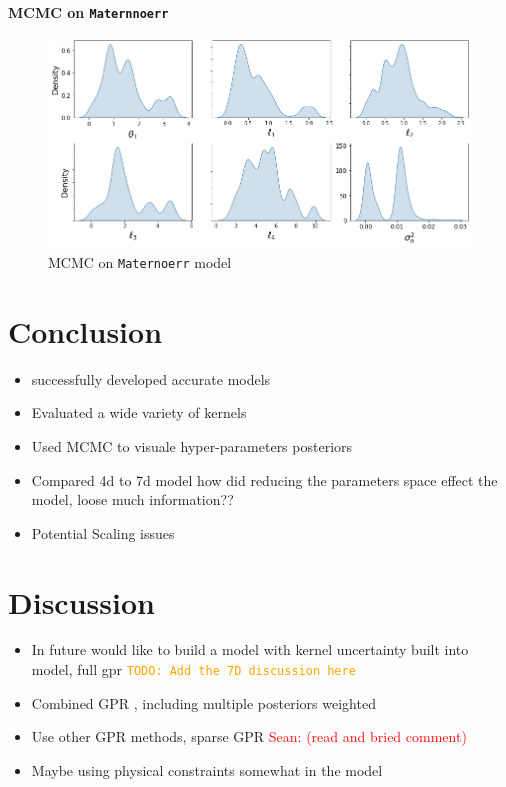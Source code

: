 \documentclass[12pt]{article}
\newcommand{\Sean}[1]{{\textcolor{red}{{Sean: #1}} }}
\newcommand{\todo}[1]{\textcolor{orange}{\texttt{TODO: #1}}}
\begin{document}
\textbf{MCMC on \texttt{Maternnoerr}}
\begin{figure}[H]
    \centering
    \includegraphics[width=1\textwidth]{LatexPlots/final_gps_plots/MCMCWhiteMat.png}
    \caption{MCMC on \texttt{Maternoerr} model}
    \label{fig:MCMCMaternnoerr}
\end{figure}


\section{Conclusion}
\begin{itemize}
    \item successfully developed accurate models
    \item Evaluated a wide variety of kernels
    \item Used MCMC to visuale hyper-parameters posteriors
    \item Compared 4d to 7d model how did reducing the parameters space effect the model, loose much information??
    \item Potential Scaling issues
\end{itemize}


\section{Discussion}
\begin{itemize}
    \item In future would like to build a model with kernel uncertainty built into model, full gpr
    \todo{Add the 7D discussion here}
    \item Combined GPR , including multiple posteriors weighted
    \item Use other GPR methods, sparse GPR \Sean{(read and bried comment)}
    \item Maybe using physical constraints somewhat in the model
\end{itemize}
\end{document}
